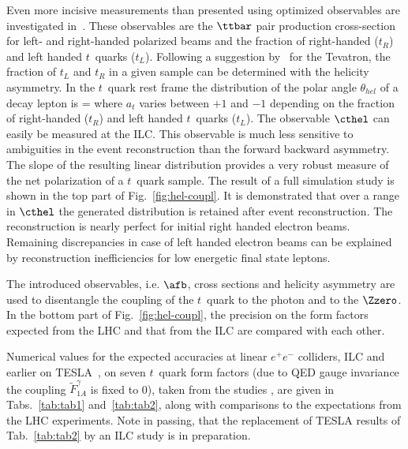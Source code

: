 Even more incisive measurements than presented using optimized 
observables are investigated in~\cite{Amjad:2013hca}. 
These observables are the $\ttbar$ pair production cross-section for left- 
and right-handed polarized beams and the fraction of right-handed ($t_R$) 
and left handed $t$~quarks ($t_L$).
Following a suggestion by~\cite{Berger:2012nw} for the Tevatron, the fraction 
of $t_L$ and $t_R$ in a given sample can be determined with the helicity 
asymmetry.  In the $t$~quark rest frame the distribution of the polar angle 
$\theta_{hel}$ of a decay lepton is 
\beq
{}  =   
where $a_t$ varies between $+1$ and $-1$ depending on the 
fraction of right-handed ($t_R$) and left handed $t$~quarks ($t_L$).
 The observable $\cthel$ can easily be measured at the ILC.  
This observable is much less sensitive to ambiguities in the 
event reconstruction than the forward backward asymmetry. The 
slope of the resulting linear distribution provides a very 
robust measure of the net polarization of a $t$~quark sample. The result of a full 
simulation study is shown in the top part of Fig.~\ref{fig:hel-coupl}.
 It is demonstrated that over a range in $\cthel$ the generated 
distribution is retained after event reconstruction. The 
reconstruction is nearly perfect for initial right handed electron beams. Remaining discrepancies in case of
 left handed electron beams can be explained by reconstruction 
inefficiencies for low energetic final state leptons. 

The introduced observables, i.e. $\afb$, cross sections and helicity asymmetry are used to disentangle the coupling of the $t$~quark to the photon and to the $\Zzero$.  
In the bottom part of  Fig.~\ref{fig:hel-coupl}, the precision on the form factors expected 
from the LHC and that from the ILC are compared with each other.
  
Numerical values for the expected accuracies at linear $e^+e^-$ colliders, ILC and earlier on TESLA~\cite{AguilarSaavedra:2001rg}, on seven $t$~quark form factors (due to QED gauge invariance the coupling $\widetilde F^\gamma_{1A}$ is fixed to 0), taken from the studies \cite{Abe:2001nq,AguilarSaavedra:2001rg,Amjad:2013hca},
are given in Tabs.~\ref{tab:tab1} and~\ref{tab:tab2}, along with comparisons to the expectations from 
the LHC experiments. Note in passing, that the replacement of TESLA results of Tab.~\ref{tab:tab2} by an ILC study is in preparation.  

